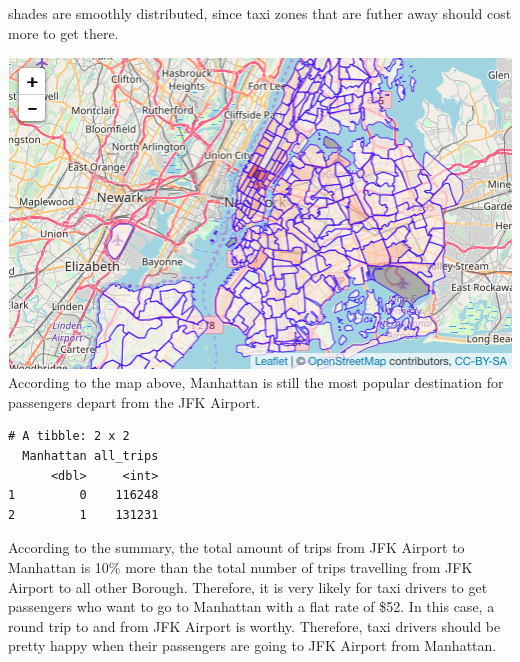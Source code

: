 \documentclass[12pt,twoside]{reedthesis}
\newenvironment{Shaded}{\begin{snugshade}}{\end{snugshade}}
\newcommand{\KeywordTok}[1]{\textcolor[rgb]{0.13,0.29,0.53}{\textbf{#1}}}
\newcommand{\DataTypeTok}[1]{\textcolor[rgb]{0.13,0.29,0.53}{#1}}
\newcommand{\DecValTok}[1]{\textcolor[rgb]{0.00,0.00,0.81}{#1}}
\newcommand{\StringTok}[1]{\textcolor[rgb]{0.31,0.60,0.02}{#1}}
\newcommand{\CommentTok}[1]{\textcolor[rgb]{0.56,0.35,0.01}{\textit{#1}}}
\newcommand{\OperatorTok}[1]{\textcolor[rgb]{0.81,0.36,0.00}{\textbf{#1}}}
\newcommand{\NormalTok}[1]{#1}
\theoremstyle{definition}
\theoremstyle{definition}
\theoremstyle{definition}
\theoremstyle{remark}
\begin{document}
shades are smoothly distributed, since taxi zones that are futher away
should cost more to get there.
\begin{Shaded}
\end{Shaded}
\includegraphics{figure/from_jkf_num.png} According to the map above,
Manhattan is still the most popular destination for passengers depart
from the JFK Airport.
\begin{Shaded}
\end{Shaded}
\begin{verbatim}
# A tibble: 2 x 2
  Manhattan all_trips
      <dbl>     <int>
1         0    116248
2         1    131231
\end{verbatim}
According to the summary, the total amount of trips from JFK Airport to
Manhattan is 10\% more than the total number of trips travelling from
JFK Airport to all other Borough. Therefore, it is very likely for taxi
drivers to get passengers who want to go to Manhattan with a flat rate
of \$52. In this case, a round trip to and from JFK Airport is worthy.
Therefore, taxi drivers should be pretty happy when their passengers are
going to JFK Airport from Manhattan.
\end{document}
